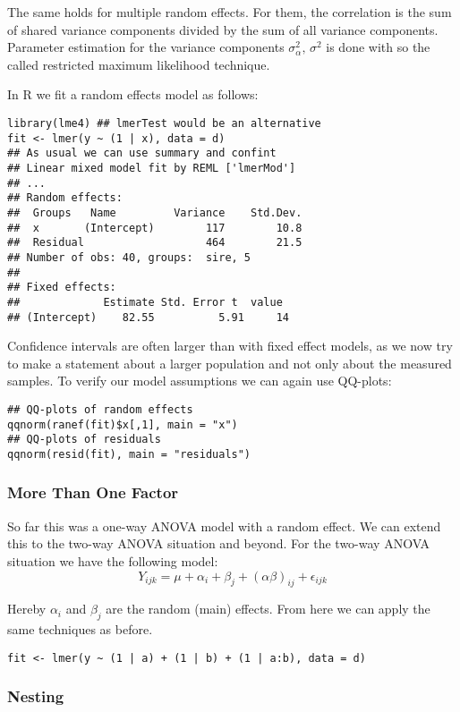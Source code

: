 The same holds for multiple random effects. For them, the correlation is the sum of shared variance components divided by the sum of all variance components. Parameter estimation for the variance components $\sigma_\alpha^2,\, \sigma^2$ is done with so the called restricted maximum likelihood technique. \medskip

In R we fit a random effects model as follows:
\begin{lstlisting}
library(lme4) ## lmerTest would be an alternative
fit <- lmer(y ~ (1 | x), data = d)
## As usual we can use summary and confint
## Linear mixed model fit by REML ['lmerMod']
## ...
## Random effects:
##  Groups   Name         Variance    Std.Dev.
##  x       (Intercept)        117        10.8    
##  Residual                   464        21.5    
## Number of obs: 40, groups:  sire, 5
## 
## Fixed effects:
##             Estimate Std. Error t  value
## (Intercept)    82.55          5.91     14
\end{lstlisting}

Confidence intervals are often larger than with fixed effect models, as we now try to make a statement about a larger population and not only about the measured samples. To verify our model assumptions we can again use QQ-plots:
\begin{lstlisting}
## QQ-plots of random effects
qqnorm(ranef(fit)$x[,1], main = "x")
## QQ-plots of residuals
qqnorm(resid(fit), main = "residuals")
\end{lstlisting}

\subsubsection{More Than One Factor}

So far this was a one-way ANOVA model with a random effect. We can extend this to the two-way ANOVA situation and beyond. For the two-way ANOVA situation we have the following model:
$$Y_{ijk} = \mu + \alpha_i + \beta_j + (\alpha \beta)_{ij} + \epsilon_{ijk}$$

Hereby $\alpha_i$ and $\beta_j$ are the random (main) effects. From here we can apply the same techniques as before.
\begin{lstlisting}
fit <- lmer(y ~ (1 | a) + (1 | b) + (1 | a:b), data = d)
\end{lstlisting}

\subsubsection{Nesting}

